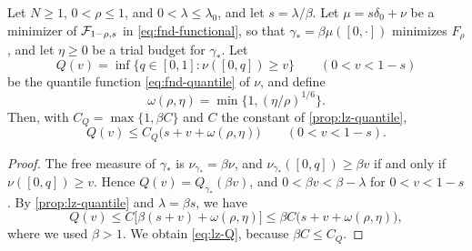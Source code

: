 \begin{corollary}
\label{cor:lz-omega}
Let $N\ge1$, $0<\rho\le1$, and $0<\lambda\le\lambda_0$, and let
$s=\lambda/\beta$. Let $\mu=s\delta_0+\nu$ be a minimizer of
$\mathcal F_{1-\rho,s}$ in \eqref{eq:fnd-functional}, so that
$\gamma_*=\beta\mu([0,\cdot])$ minimizes $F_\rho$, and let $\eta\ge0$ be a
trial budget for $\gamma_*$. Let
\[
 Q(v)=\inf\{q\in[0,1]:\nu([0,q])\ge v\}\qquad(0<v<1-s)
\]
be the quantile function \eqref{eq:fnd-quantile} of $\nu$, and define
\begin{equation}\label{eq:lz-omega}
 \omega(\rho,\eta)=\min\{1,(\eta/\rho)^{1/6}\}.
\end{equation}
Then, with $C_Q=\max\{1,\beta C\}$ and $C$ the constant of
\cref{prop:lz-quantile},
\begin{equation}\label{eq:lz-Q}
 Q(v)\le C_Q\bigl(s+v+\omega(\rho,\eta)\bigr)
 \qquad(0<v<1-s).
\end{equation}
\end{corollary}

\begin{proof}
The free measure of $\gamma_*$ is $\nu_{\gamma_*}=\beta\nu$, and
$\nu_{\gamma_*}([0,q])\ge\beta v$ if and only if $\nu([0,q])\ge v$. Hence
$Q(v)=Q_{\gamma_*}(\beta v)$, and $0<\beta v<\beta-\lambda$ for
$0<v<1-s$. By
\cref{prop:lz-quantile} and $\lambda=\beta s$, we have
\[
 Q(v)\le C\bigl[\beta(s+v)+\omega(\rho,\eta)\bigr]\le\beta C\bigl(s+v+\omega(\rho,\eta)\bigr),
\]
where we used $\beta>1$. We obtain \eqref{eq:lz-Q}, because $\beta C\le C_Q$.
\end{proof}
